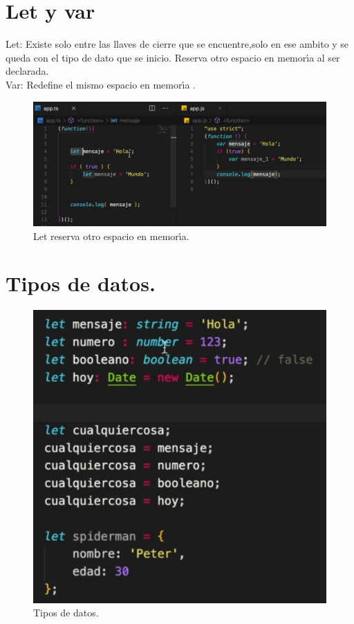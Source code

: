 \section{Let y var}
Let: Existe solo entre las llaves de cierre que se encuentre,solo en ese ambito y se queda con el tipo de dato que se inicio. Reserva otro espacio en memor\'\i{}a al ser declarada.\\
Var: Redefine el mismo espacio en memor\'\i{}a .
\begin{figure}[H] 
	\centering
	\includegraphics[scale=0.45]{images/c2_3.jpg}
	\caption{Let reserva otro espacio en memor\'\i{}a.}
\end{figure}

\section{Tipos de datos.}
\begin{figure}[H] 
	\centering
	\includegraphics[scale=0.6]{images/c2_4.jpg}
	\caption{Tipos de datos.}
\end{figure}

